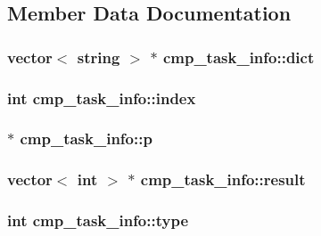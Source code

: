 \subsection{Member Data Documentation}
\hypertarget{structcmp__task__info_ae886fd2b9fa914fd8937ff6aea779234}{
\subsubsection[{dict}]{\setlength{\rightskip}{0pt plus 5cm}vector$<$ string $>$ $\ast$ cmp\+\_\+task\+\_\+info\+::dict}}\label{structcmp__task__info_ae886fd2b9fa914fd8937ff6aea779234}
\hypertarget{structcmp__task__info_a3633d922d3eef29d9ebb03ca51010b8f}{
\subsubsection[{index}]{\setlength{\rightskip}{0pt plus 5cm}int cmp\+\_\+task\+\_\+info\+::index}}\label{structcmp__task__info_a3633d922d3eef29d9ebb03ca51010b8f}
\hypertarget{structcmp__task__info_ad0c6b8c7f0797b2043dba88d679d8f2f}{
\subsubsection[{p}]{ $\ast$ cmp\+\_\+task\+\_\+info\+::p}}\label{structcmp__task__info_ad0c6b8c7f0797b2043dba88d679d8f2f}
\hypertarget{structcmp__task__info_acf3590e23bc8a1c548ffa74a7c5d794c}{
\subsubsection[{result}]{\setlength{\rightskip}{0pt plus 5cm}vector$<$ int $>$ $\ast$ cmp\+\_\+task\+\_\+info\+::result}}\label{structcmp__task__info_acf3590e23bc8a1c548ffa74a7c5d794c}
\hypertarget{structcmp__task__info_a96314bf00c0c73e503a81ecdcd6502be}{
\subsubsection[{type}]{\setlength{\rightskip}{0pt plus 5cm}int cmp\+\_\+task\+\_\+info\+::type}}\label{structcmp__task__info_a96314bf00c0c73e503a81ecdcd6502be}
